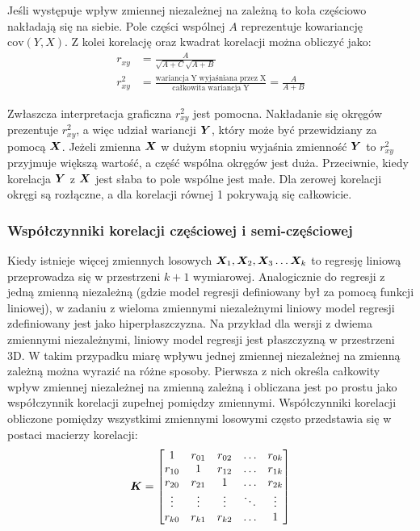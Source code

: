 \begin{appendices}
Jeśli występuje wpływ zmiennej niezależnej na zależną to koła częściowo nakładają się na siebie. Pole części wspólnej $A$ reprezentuje kowariancję $\mathrm{cov}(Y,X)$. Z kolei korelację oraz kwadrat korelacji można obliczyć jako:
\begin{equation}
	\begin{split}
	r_{xy} &= \frac{A}{\sqrt{A+C}\sqrt{A+B}} \\
	r_{xy}^2&= \frac{\mathrm{wariancja\;Y\;wyjaśniana\;przez\;X}}{\mathrm{całkowita\; wariancja\;Y}}=\frac{A}{A+B}
\end{split}
\end{equation}

Zwłaszcza interpretacja graficzna $r_{xy}^2$ jest pomocna. Nakładanie się okręgów prezentuje $r_{xy}^2$, a więc udział wariancji $\bm{Y}$, który może być przewidziany za pomocą $\bm{X}$. Jeżeli zmienna $\bm{X}$ w dużym stopniu wyjaśnia zmienność $\bm{Y}$ to $r_{xy}^2$ przyjmuje większą wartość, a część wspólna okręgów jest duża. Przeciwnie, kiedy korelacja $\bm{Y}$ z $\bm{X}$ jest słaba to pole wspólne jest małe. Dla zerowej korelacji okręgi są rozłączne, a dla korelacji równej 1 pokrywają się całkowicie.




\subsubsection{Współczynniki korelacji częściowej i semi-częściowej}

Kiedy istnieje więcej zmiennych losowych $\vect{X}_1, \vect{X}_2, \vect{X}_3 \dots \vect{X}_k$ to regresję liniową przeprowadza się w przestrzeni $k+1$ wymiarowej. Analogicznie do regresji z jedną zmienną niezależną (gdzie model regresji definiowany był za pomocą funkcji liniowej), w zadaniu z wieloma zmiennymi niezależnymi liniowy model regresji zdefiniowany jest jako hiperpłaszczyzna. Na przykład dla wersji z dwiema zmiennymi niezależnymi, liniowy model regresji jest płaszczyzną w przestrzeni 3D. W takim przypadku miarę wpływu jednej zmiennej niezależnej na zmienną zależną można wyrazić na różne sposoby. Pierwsza z nich określa całkowity wpływ zmiennej niezależnej na zmienną zależną i obliczana jest po prostu jako współczynnik korelacji zupełnej pomiędzy zmiennymi. Współczynniki korelacji obliczone pomiędzy wszystkimi zmiennymi losowymi często przedstawia się w postaci macierzy korelacji:
\begin{equation}
	\bm{K}=\begin{bmatrix}
1      & r_{01} &  r_{02} & \dots & r_{0k} \\
r_{10} & 1 		&  r_{12} & \dots & r_{1k} \\
r_{20} & r_{21}	&  1 	  & \dots & r_{2k} \\
\vdots & \vdots &  \vdots & \ddots & \vdots \\
r_{k0} & r_{k1} & 	r_{k2} & \dots & 1
	\end{bmatrix}
\end{equation}


\end{appendices}
